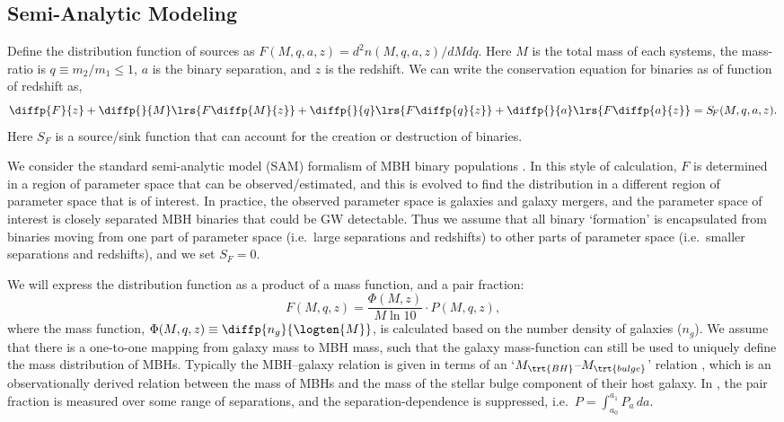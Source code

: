     \subsection{Semi-Analytic Modeling}

    Define the distribution function of sources as $F(M,q,a,z) = d^2 n(M,q,a,z) / dM dq$.  Here $M$ is the total mass of each systems, the mass-ratio is $q\equiv m_2/m_1 \leq 1$, $a$ is the binary separation, and $z$ is the redshift.
    We can write the conservation equation for binaries as of function of redshift as,
    \begin{equation}
        \label{eq:conservation}
        \diffp{F}{z} +
            \diffp{}{M} \lrs{F \diffp{M}{z}} +
            \diffp{}{q} \lrs{F \diffp{q}{z}} +
            \diffp{}{a} \lrs{F \diffp{a}{z}} = S_{\!F}(M, q, a, z).
    \end{equation}
    Here $S_{\!F}$ is a source/sink function that can account for the creation or destruction of binaries.

    We consider the standard semi-analytic model (SAM) formalism of MBH binary populations \citep[e.g.~][]{Sesana+2008, Chen+2019}.  In this style of calculation, $F$ is determined in a region of parameter space that can be observed/estimated, and this is evolved to find the distribution in a different region of parameter space that is of interest.  In practice, the observed parameter space is galaxies and galaxy mergers, and the parameter space of interest is closely separated MBH binaries that could be GW detectable.  Thus we assume that all binary `formation' is encapsulated from binaries moving from one part of parameter space (i.e.~large separations and redshifts) to other parts of parameter space (i.e.~smaller separations and redshifts), and we set $S_{\!F} = 0$.

    We will express the distribution function as a product of a mass function, and a pair fraction:
    \begin{equation}
        \label{eq:dist_func}
        F(M,q,z) = \frac{\Phi(M, z)}{M \ln\!10} \cdot P(M,q,z),
    \end{equation}
    where the mass function, $\Phi(M, q, z) \equiv \diffp{n_g}{{\logten{M}}}$, is calculated based on the number density of galaxies ($n_g$).  We assume that there is a one-to-one mapping from galaxy mass to MBH mass, such that the galaxy mass-function can still be used to uniquely define the mass distribution of MBHs.  Typically the MBH--galaxy relation is given in terms of an `$M_\trt{BH}$--$M_\trt{bulge}$' relation \citep[e.g.][]{Kormendy+Ho-2013}, which is an observationally derived relation between the mass of MBHs and the mass of the stellar bulge component of their host galaxy.
    In \citet{Chen+2019}, the pair fraction is measured over some range of separations, and the separation-dependence is suppressed, i.e.~$P = \int_{a_0}^{a_1} P_a \, da$.

